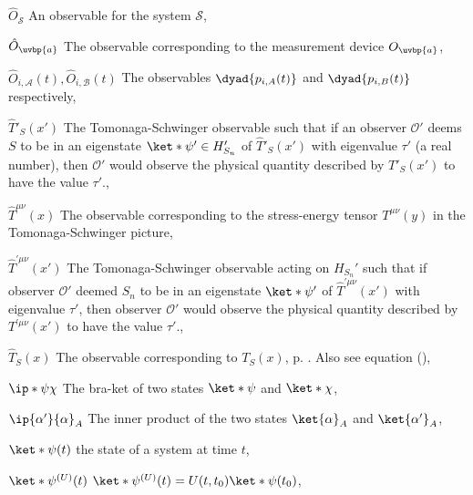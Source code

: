 \begin{thenomenclature}
      \item [{$\hat{O}_{\mathcal{S}}$}]\begingroup An observable for the system $\mathcal{S}$, \nomrefpage{}
      \item [{$\hat{O}_{\uvbp{a}}$}]\begingroup The observable corresponding to the measurement device $O_{\uvbp{a}}$, \nomrefpage{}
      \item [{$\hat{O}_{i,\mathcal{A}}(t), \hat{O}_{i,\mathcal{B}}(t)$}]\begingroup The observables $\dyad{p_{i,A}(t)}$ and $\dyad{p_{i,B}(t)}$ respectively,  \nomrefpage{}
      \item [{$\hat{T}'_S(x')$}]\begingroup The Tomonaga-Schwinger observable  such that if an observer $\mathcal{O}'$ deems $S$ to be in an eigenstate $\ket*{\psi'}\in H'_{S_n}$ of  $\hat{T}'_S(x')$ with eigenvalue $\tau'$ (a real number), then  $\mathcal{O}'$ would observe the physical quantity described by  $T'_S(x')$ to have the value $\tau'$., \nomrefpage{}
      \item [{$\hat{T}^{\mu\nu}(x)$}]\begingroup The observable corresponding to the stress-energy tensor $T^{\mu\nu}(y)$ in the Tomonaga-Schwinger picture, \nomrefpage{}
      \item [{$\hat{T}^{\prime\mu\nu}(x')$}]\begingroup The Tomonaga-Schwinger observable acting on $H_{S_n}'$ such that if observer $\mathcal{O}'$ deemed $S_n$ to be in an eigenstate $\ket*{\psi'}$ of  $\hat{T}^{\prime\mu\nu}(x')$ with eigenvalue $\tau'$, then observer $\mathcal{O}'$ would observe the physical quantity described by  $T^{\prime\mu\nu}(x')$ to have the value $\tau'$., \nomrefpage{}
      \item [{$\hat{T}_S(x)$}]\begingroup The observable corresponding to $T_S(x)$, p. \pageref{firstHatTS}. Also see equation (\pageref{TShat}), \nomrefpage{}
      \item [{$\ip*{\psi}{\chi}$}]\begingroup The bra-ket of two states $\ket*{\psi}$ and $\ket*{\chi}$, \nomrefpage{}
      \item [{$\ip{\alpha'}{\alpha}_A$}]\begingroup The inner product of the two states $\ket{\alpha}_A$ and $\ket{\alpha'}_A$, \nomrefpage{}
      \item [{$\ket *{\psi (t)}$}]\begingroup the state of a system at time $t$, \nomrefpage {}
      \item [{$\ket *{\psi ^{(U)}(t)}$}]\begingroup $\ket *{\psi ^{(U)}(t)}=U(t,t_0)\ket *{\psi (t_0)}$, \nomrefpage {}

\end{thenomenclature}
